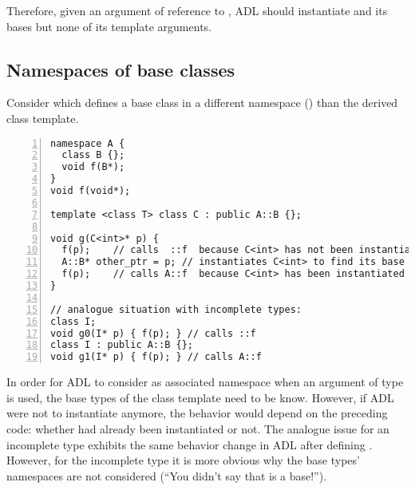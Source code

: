Therefore, given an argument of reference to , ADL should instantiate  and 
its bases but none of its template arguments.

\subsection{Namespaces of base classes}

Consider  which defines a base class in a different namespace 
() than the derived class template.
\begin{lstlisting}[style=Vc,numbers=left,float={hbtp},label=lst:baseNamespace,caption={
ADL in namespace of base class
}]
namespace A {
  class B {};
  void f(B*);
}
void f(void*);

template <class T> class C : public A::B {};

void g(C<int>* p) {
  f(p);    // calls  ::f  because C<int> has not been instantiated
  A::B* other_ptr = p; // instantiates C<int> to find its base types
  f(p);    // calls A::f  because C<int> has been instantiated before ADL
}

// analogue situation with incomplete types:
class I;
void g0(I* p) { f(p); } // calls ::f
class I : public A::B {};
void g1(I* p) { f(p); } // calls A::f
\end{lstlisting}
In order for ADL to consider  as associated namespace when an argument of type 
 is used, the base types of the class template need to be know. However, if 
ADL were not to instantiate  anymore, the behavior would depend on the 
preceding code: whether  had already been instantiated or not. The analogue 
issue for an incomplete type  exhibits the same behavior change in ADL after 
defining . However, for the incomplete type it is more obvious why the base types' 
namespaces are not considered (“You didn't say that  is a base!”).

